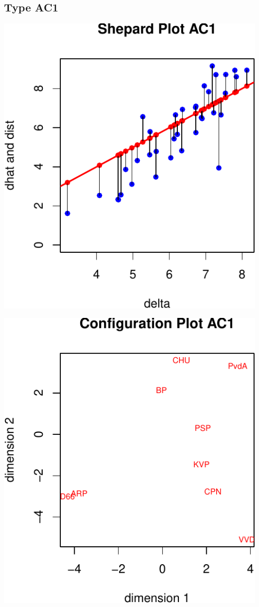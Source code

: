 \documentclass[
  12pt,
]{article}
\begin{document}
\subsection{Type AC1}\label{type-ac1-1}

\begin{center}\includegraphics{smacofAC_files/figure-latex/gruijterh00-1} \end{center}

\begin{center}\includegraphics{smacofAC_files/figure-latex/gruijterh00-2} \end{center}
\end{document}
